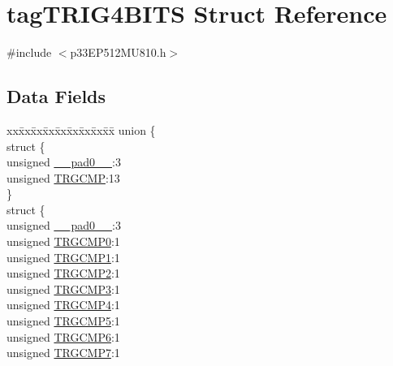 \hypertarget{structtag_t_r_i_g4_b_i_t_s}{}\section{tag\+T\+R\+I\+G4\+B\+I\+TS Struct Reference}
\label{structtag_t_r_i_g4_b_i_t_s}


{\ttfamily \#include $<$p33\+E\+P512\+M\+U810.\+h$>$}

\subsection*{Data Fields}
\begin{DoxyCompactItemize}
\item 
\begin{tabbing}
xx\=xx\=xx\=xx\=xx\=xx\=xx\=xx\=xx\=\kill
union \{\\
\>struct \{\\
\>\>unsigned \hyperlink{structtag_t_r_i_g4_b_i_t_s_adf71f3d8410c1f1dbbc96680a92c49af}{\_\_pad0\_\_}:3\\
\>\>unsigned \hyperlink{structtag_t_r_i_g4_b_i_t_s_aceafdcd310f8a6833f64c9d20ec5567e}{TRGCMP}:13\\
\>\} \\
\>struct \{\\
\>\>unsigned \hyperlink{structtag_t_r_i_g4_b_i_t_s_adf71f3d8410c1f1dbbc96680a92c49af}{\_\_pad0\_\_}:3\\
\>\>unsigned \hyperlink{structtag_t_r_i_g4_b_i_t_s_a592102a5d0362674b8b287b5f8dd9f2a}{TRGCMP0}:1\\
\>\>unsigned \hyperlink{structtag_t_r_i_g4_b_i_t_s_ab2a016c04074d53199dbd32df07c6d09}{TRGCMP1}:1\\
\>\>unsigned \hyperlink{structtag_t_r_i_g4_b_i_t_s_a1fd283d3a2f1005e0d597b4e61399485}{TRGCMP2}:1\\
\>\>unsigned \hyperlink{structtag_t_r_i_g4_b_i_t_s_a823f89a0ad77efa6c3c8d01c3932f03e}{TRGCMP3}:1\\
\>\>unsigned \hyperlink{structtag_t_r_i_g4_b_i_t_s_a2bf01f968c2bba2453f76d1590c70490}{TRGCMP4}:1\\
\>\>unsigned \hyperlink{structtag_t_r_i_g4_b_i_t_s_a6dc78e81c5a3e6993b4558dff9657ee2}{TRGCMP5}:1\\
\>\>unsigned \hyperlink{structtag_t_r_i_g4_b_i_t_s_a9ba81e821299317a829e795392b93beb}{TRGCMP6}:1\\
\>\>unsigned \hyperlink{structtag_t_r_i_g4_b_i_t_s_aa801131b5ab0b542a360d202275ea4fd}{TRGCMP7}:1\\

\end{tabbing}
\end{DoxyCompactItemize}

